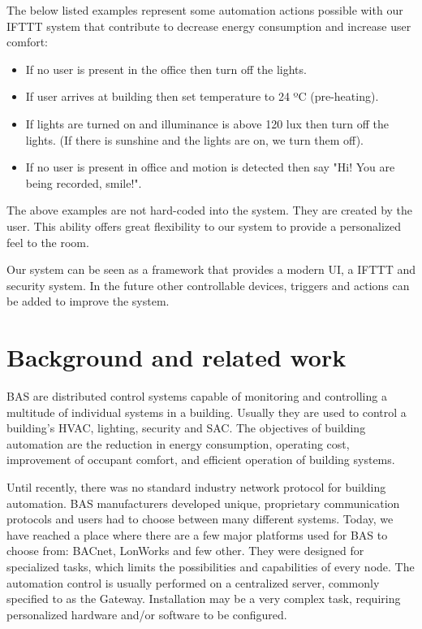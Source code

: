 \documentclass[conference]{IEEEtran}
\begin{document}
The below listed examples represent some automation actions possible with our \ac{IFTTT} system that contribute to decrease energy consumption and increase user comfort:

\begin{itemize}
\item If no user is present in the office then turn off the lights.
\item If user arrives at building then set temperature to 24 ºC (pre-heating). 
\item If lights are turned on and illuminance is above 120 lux then turn off the lights. (If there is  sunshine and the lights are on, we turn them off).
\item If no user is present in office and motion is detected then say "Hi! You are being recorded, smile!".
\end{itemize}

The above examples are not hard-coded into the system. They are created by the user. This ability offers great flexibility to our system to provide a personalized feel to the room.

Our system can be seen as a framework that provides a modern \ac{UI}, a \ac{IFTTT} and security system. In the future other controllable devices, triggers and actions can be added to improve the system.




\section{Background and related work}
\label{rel}

\ac{BAS} are distributed control systems capable of monitoring and controlling a multitude of individual systems in a building. Usually they are used to control a building's \ac{HVAC}, lighting, security and \ac{SAC}.
The objectives of building automation are the reduction in energy consumption, operating cost, improvement of occupant comfort, and efficient operation of building systems.



Until recently, there was no standard industry network protocol for building automation. \ac{BAS} manufacturers developed unique, proprietary communication protocols and users had to choose between many different systems. Today, we have reached a place where there are a few major platforms used for \ac{BAS} to choose from: BACnet\cite{livro_automation,bacnet:artigo1,bacnet:bib,livro_automation2}, LonWorks\cite{livro_automation2,livro_automation} and few other. 
They were designed for specialized tasks, which limits the possibilities and capabilities of every node. The automation control is usually performed on a
centralized server, commonly specified to as the Gateway. Installation may be a very complex task, requiring personalized hardware and/or software to be configured.
\end{document}

